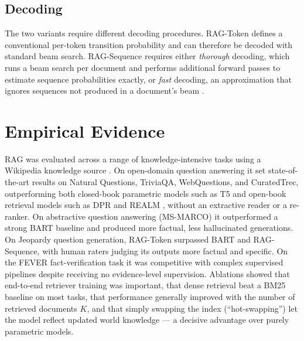 \documentclass[12pt,a4paper,titlepage,oneside]{book}
\begin{document}
\subsection{Decoding}
The two variants require different decoding procedures. RAG-Token defines a conventional per-token transition probability and can therefore be decoded with standard beam search. RAG-Sequence requires either \emph{thorough} decoding, which runs a beam search per document and performs additional forward passes to estimate sequence probabilities exactly, or \emph{fast} decoding, an approximation that ignores sequences not produced in a document's beam \cite{lewis2020rag}.

\section{Empirical Evidence}
RAG was evaluated across a range of knowledge-intensive tasks using a Wikipedia knowledge source \cite{lewis2020rag}. On open-domain question answering it set state-of-the-art results on Natural Questions, TriviaQA, WebQuestions, and CuratedTrec, outperforming both closed-book parametric models such as T5 \cite{raffel2020t5} and open-book retrieval models such as DPR \cite{karpukhin2020dpr} and REALM \cite{guu2020realm}, without an extractive reader or a re-ranker. On abstractive question answering (MS-MARCO) it outperformed a strong BART baseline and produced more factual, less hallucinated generations. On Jeopardy question generation, RAG-Token surpassed BART and RAG-Sequence, with human raters judging its outputs more factual and specific. On the FEVER fact-verification task it was competitive with complex supervised pipelines despite receiving no evidence-level supervision. Ablations showed that end-to-end retriever training was important, that dense retrieval beat a BM25 baseline on most tasks, that performance generally improved with the number of retrieved documents $K$, and that simply swapping the index (``hot-swapping'') let the model reflect updated world knowledge — a decisive advantage over purely parametric models.
\end{document}
